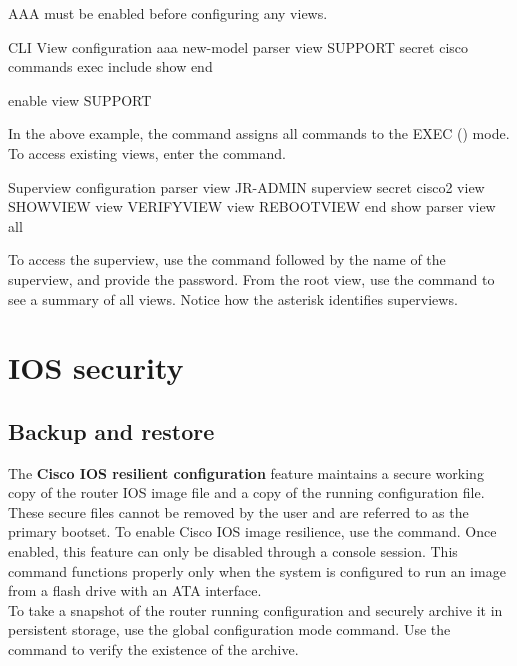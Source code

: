 \note AAA must be enabled before configuring any views.

\begin{sexylisting}{CLI View configuration}
aaa new-model
parser view SUPPORT
  secret cisco
  commands exec include show
end

enable view SUPPORT
\end{sexylisting}

In the above example, the  command assigns all  commands to the EXEC () mode. To access existing views, enter the  command.

\begin{sexylisting}{Superview configuration}
parser view JR-ADMIN superview
  secret cisco2
  view SHOWVIEW
  view VERIFYVIEW
  view REBOOTVIEW
end
show parser view all
\end{sexylisting}

To access the superview, use the  command followed by the name of the superview, and provide the password. From the root view, use the  command to see a summary of all views. Notice how the asterisk identifies superviews.

\section{IOS security}

\subsection{Backup and restore}

The \textbf{Cisco IOS resilient configuration} feature maintains a secure working copy of the router IOS image file and a copy of the running configuration file. These secure files cannot be removed by the user and are referred to as the primary bootset. To enable Cisco IOS image resilience, use the  command. Once enabled, this feature can only be disabled through a console session. This command functions properly only when the system is configured to run an image from a flash drive with an ATA interface.\\

To take a snapshot of the router running configuration and securely archive it in persistent storage, use the  global configuration mode command. Use the  command to verify the existence of the archive.\\

